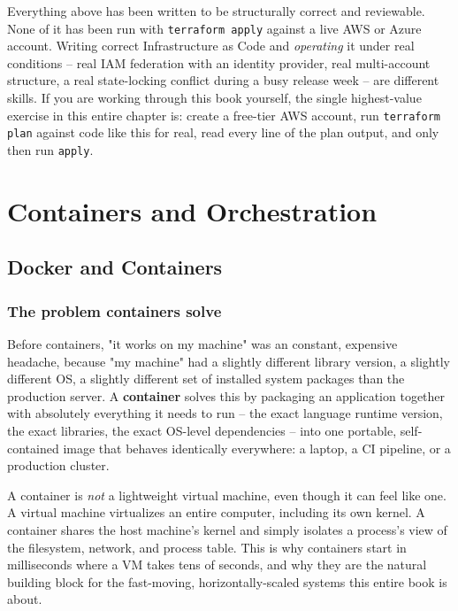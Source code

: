 \documentclass[11pt,twoside,openright]{book}
\begin{document}
\begin{gap}
Everything above has been written to be structurally correct and reviewable. None of it
has been run with \texttt{terraform apply} against a live AWS or Azure account. Writing
correct Infrastructure as Code and \emph{operating} it under real conditions -- real IAM
federation with an identity provider, real multi-account structure, a real state-locking
conflict during a busy release week -- are different skills. If you are working through
this book yourself, the single highest-value exercise in this entire chapter is: create a
free-tier AWS account, run \texttt{terraform plan} against code like this for real, read
every line of the plan output, and only then run \texttt{apply}.
\end{gap}

\part{Containers and Orchestration}

\chapter{Docker and Containers}
\label{ch:docker}

\section{The problem containers solve}

Before containers, "it works on my machine" was an constant, expensive headache, because
"my machine" had a slightly different library version, a slightly different OS, a
slightly different set of installed system packages than the production server. A
\textbf{container} solves this by packaging an application together with absolutely
everything it needs to run -- the exact language runtime version, the exact libraries, the
exact OS-level dependencies -- into one portable, self-contained image that behaves
identically everywhere: a laptop, a CI pipeline, or a production cluster.

A container is \emph{not} a lightweight virtual machine, even though it can feel like one.
A virtual machine virtualizes an entire computer, including its own kernel. A container
shares the host machine's kernel and simply isolates a process's view of the filesystem,
network, and process table. This is why containers start in milliseconds where a VM takes
tens of seconds, and why they are the natural building block for the fast-moving,
horizontally-scaled systems this entire book is about.
\end{document}
